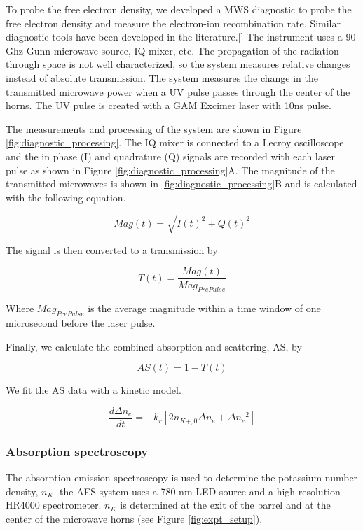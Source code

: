 To probe the free electron density, we developed a MWS diagnostic to probe the free electron density and measure the electron-ion recombination rate. Similar diagnostic tools have been developed in the literature.[] The instrument uses a 90 Ghz Gunn microwave source, IQ mixer, etc. The propagation of the radiation through space is not well characterized, so the system measures relative changes instead of absolute transmission. The system measures the change in the transmitted microwave power when a UV pulse passes through the center of the horns. The UV pulse is created with a GAM Excimer laser with 10ns pulse. 

The measurements and processing of the system are shown in Figure \ref{fig:diagnostic_processing}. The IQ mixer is connected to a Lecroy oscilloscope and the in phase (I) and quadrature (Q) signals are recorded with each laser pulse as shown in Figure \ref{fig:diagnostic_processing}A. The magnitude of the transmitted microwaves is shown in \ref{fig:diagnostic_processing}B and is calculated with the following equation.

\begin{equation}
    Mag(t) = \sqrt{I(t)^2 + Q(t)^2}
\end{equation}

The signal is then converted to a transmission by 

\begin{equation}
    T(t) = \frac{Mag(t)}{Mag_{Pre Pulse}}
\end{equation}

Where $Mag_{Pre Pulse}$ is the average magnitude within a time window of one microsecond before the laser pulse. 

Finally, we calculate the combined absorption and scattering, AS, by

\begin{equation}
    AS(t) = 1 - T(t)
\end{equation}

We fit the AS data with a kinetic model. 

\begin{equation}
    \frac{d\Delta n_e}{dt} = - k_r [2 n_{K+,0}\Delta n_e + \Delta{n_e}^2]
\end{equation}

\subsubsection{Absorption spectroscopy}

The absorption emission spectroscopy is used to determine the potassium number density, $n_K$. the AES system uses a 780 nm LED source and a high resolution HR4000 spectrometer. $n_K$ is determined at the exit of the barrel and at the center of the microwave horns (see Figure \ref{fig:expt_setup}).

